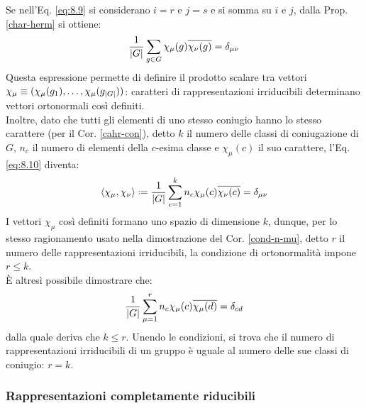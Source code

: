 Se nell'Eq. \ref{eq:8.9} si considerano $ i = r $ e $ j = s $ e si somma su $ i $ e $ j $, dalla Prop. \ref{char-herm} si ottiene:
\begin{equation}
	\frac{1}{\left\lvert G\right\rvert} \sum_{g \in G} \chi_{\mu}(g) \overline{\chi_{\nu}(g)} = \delta_{\mu \nu}
	\label{eq:8.10}
\end{equation}
Questa espressione permette di definire il prodotto scalare tra vettori $ \chi_{\mu} \equiv (\chi_{\mu}(g_1), \dots, \chi_{\mu}(g_{\left\lvert G\right\rvert})) $: caratteri di rappresentazioni irriducibili determinano vettori ortonormali così definiti.\\
Inoltre, dato che tutti gli elementi di uno stesso coniugio hanno lo stesso carattere (per il Cor. \ref{cahr-con}), detto $ k $ il numero delle classi di coniugazione di $ G $, $ n_c $ il numero di elementi della $ c $-esima classe e $ \chi_{\mu}(c) $ il suo carattere, l'Eq. \ref{eq:8.10} diventa:
\begin{equation}
	\braket{\chi_{\mu},\chi_{\nu}} \defeq \frac{1}{\abs{G}} \sum_{c = 1}^{k} n_c \chi_{\mu}(c) \overline{\chi_{\nu}(c)} = \delta_{\mu \nu}
	\label{eq:8.11}
\end{equation}
I vettori $ \chi_{\mu} $ così definiti formano uno spazio di dimensione $ k $, dunque, per lo stesso ragionamento usato nella dimostrazione del Cor. \ref{cond-n-mu}, detto $ r $ il numero delle rappresentazioni irriducibili, la condizione di ortonormalità impone $ r \le k $.\\
È altresì possibile dimostrare che:
\begin{equation}
	\frac{1}{\left\lvert G\right\rvert} \sum_{\mu = 1}^{r} n_c \chi_{\mu}(c) \overline{\chi_{\mu}(d)} = \delta_{cd}
	\label{eq:8.12}
\end{equation}
dalla quale deriva che $ k \le r $. Unendo le condizioni, si trova che il numero di rappresentazioni irriducibili di un gruppo è uguale al numero delle sue classi di coniugio: $ r = k $.

\subsubsection{Rappresentazioni completamente riducibili}

